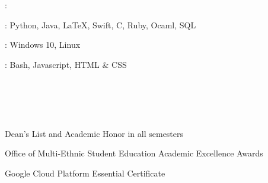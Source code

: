 \documentclass{resume}
\newif\ifen
\newif\ifzh
\newif\ifboth
\newcommand{\en}[1]{\ifen#1\fi}
\newcommand{\zh}[1]{\ifzh#1\fi}
\newcommand{\both}[1]{\ifboth#1\fi}
\begin{document}
    \en{\datedsubsection{University of Maryland}{Sep. 2018 -- Dec. 2019}}
    \zh{\datedsubsection{美国马里兰大学}{2018年9月 -- 2019年12月}}
    \begin{ind}
        \en{\role{Research Assistant}{Department of Human Development and Quantitative Methodology}}
        \zh{\role{研究助理}{}}
    \end{ind}
    \en{
        \begin{jobitemize}
            \item Data entry, literature review and basic data compiling for cognitive diagnosis modeling.
            \item Provides visual interpretation and analysis presentations.
        \end{jobitemize}
    }
    \zh{为认知分析建模进行数据输入，文学评估与数据分析。}

    \en{\datedsubsection{Rural Teacher Training}{Summer 2015 -- Summer 2018}}
    \begin{ind}
        \en{\role{Volunteer}{Event Organizer}}
    \end{ind}
    \en{
        \begin{jobitemize}
            \item Organized multiple entertainment events with over 500 audiences.
            \item Made arrangements with vendors and sponsors.
            \item Hosted in one of these events.
        \end{jobitemize}
    }

    \section{\faCogs\ \en{Skills}\both{ }\zh{技能}}
    \begin{myitemize}
        \item \en{Languages}\both{ }\zh{语言}: \en{English - Proficient, Chinese - Native}
        \item \en{Programming Languages}\both{ }\zh{编程语言}: Python, Java, \LaTeX, Swift, C, Ruby, Ocaml, SQL
        \item \en{Platform}\both{ }\zh{平台}: Windows 10, Linux
        \item \en{Others}\both{ }\zh{其他}: Bash, Javascript, HTML \& CSS
        \item \en{Class B Commercial Drivers' License}
    \end{myitemize}

    \section{\faCertificate\ \en{Honors \& Certificates}\both{ }\zh{荣誉与证书}}
    \begin{myitemize}
        \item Dean's List and Academic Honor in all semesters
        \item Office of Multi-Ethnic Student Education Academic Excellence Awards
        \item Google Cloud Platform Essential Certificate
    \end{myitemize}
\end{document}
